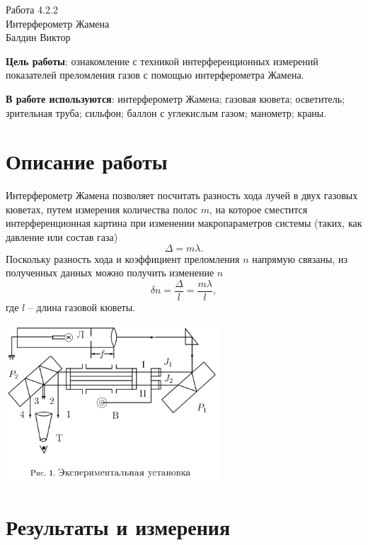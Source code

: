 \documentclass[a4paper,12pt]{article}
\begin{document}
\begin{center}
  \LARGE{Работа 4.2.2}\\[0.2cm]
  \LARGE{Интерферометр Жамена}\\[0.2cm]
  \large{Балдин Виктор}\\[0.2cm]
\end{center}

\textbf{Цель работы}: ознакомление с техникой интерференционных измерений показателей преломления газов с помощью интерферометра Жамена.

\textbf{В работе используются}: интерферометр Жамена; газовая кювета; осветитель; зрительная труба; сильфон; баллон с углекислым газом; манометр; краны.

\section*{Описание работы}
Интерферометр Жамена позволяет посчитать разность хода лучей в двух газовых кюветах, путем измерения количества полос $m$, на которое сместится интерференционная картина при изменении макропараметров системы (таких, как давление или состав газа)
\[\Delta = m \lambda.\]
Поскольку разность хода и коэффициент преломления $n$ напрямую связаны, из полученных данных можно получить изменение $n$
\[\delta n = \frac{\Delta}{l} = \frac{m \lambda}{l},\]
где $l$ -- длина газовой кюветы.

\begin{center}
\includegraphics[width=0.60\textwidth]{0.png}
\end{center}

\section*{Результаты и измерения}
\end{document}
